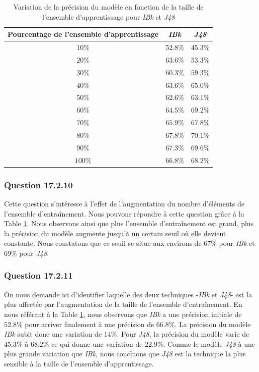 \documentclass[11pt,a4paper]{article}
\begin{document}
				\begin{table}[h]
					\centering
					\caption{Variation de la précision du modèle en fonction de la taille de l'ensemble d'apprentissage pour \textit{IBk} et \textit{J48}}
					\label{tab-IBk-J48}
					\begin{tabular}{|c|c|c|}
						\hline
						Pourcentage de l'ensemble d'apprentissage & \textit{IBk} & \textit{J48}\\
						\hline
						$10\%$ & $52.8\%$ & $45.3\%$ \\
						\hline
						$20\%$ & $63.6\%$ & $53.3\%$ \\
						\hline
						$30\%$ & $60.3\%$ & $59.3\%$ \\
						\hline
						$40\%$ & $63.6\%$ & $65.0\%$ \\
						\hline
						$50\%$ & $62.6\%$ & $63.1\%$ \\
						\hline
						$60\%$ & $64.5\%$ & $69.2\%$ \\
						\hline
						$70\%$ & $65.9\%$ & $67.8\%$ \\
						\hline
						$80\%$ & $67.8\%$ & $70.1\%$ \\
						\hline
						$90\%$ & $67.3\%$ & $69.6\%$ \\
						\hline
						$100\%$ & $66.8\%$ & $68.2\%$ \\
						\hline
					\end{tabular}
				\end{table}
			
			\subsubsection*{Question 17.2.10}
		
			Cette question s'intéresse à l'effet de l'augmentation du nombre d'éléments de l'ensemble d'entraînement. Nous pouvons répondre à cette question grâce à la Table \ref{tab-IBk-J48}. Nous observons ainsi que plus l'ensemble d'entraînement est grand, plus la précision du modèle augmente jusqu'à un certain seuil où elle devient constante. Nous constatons que ce seuil se situe aux environs de $67\%$ pour \textit{IBk} et $69\%$ pour \textit{J48}.
		
			\subsubsection*{Question 17.2.11}
		
			On nous demande ici d'identifier laquelle des deux techniques -\textit{IBk} et \textit{J48}- est la plus affectée par l'augmentation de la taille de l'ensemble d'entraînement. En nous référant à la Table \ref{tab-IBk-J48}, nous observons que \textit{IBk} a une précision initiale de $52.8\%$ pour arriver finalement à une précision de $66.8\%$. La précision du modèle \textit{IBk} subit donc une variation de $14\%$. Pour \textit{J48}, la précision du modèle varie de $45.3\%$ à $68.2\%$ ce qui donne une variation de $22.9\%$. Comme le modèle \textit{J48} à une plus grande variation que \textit{IBk}, nous concluons que \textit{J48} est la technique la plus sensible à la taille de l'ensemble d'apprentissage.
			
\end{document}

